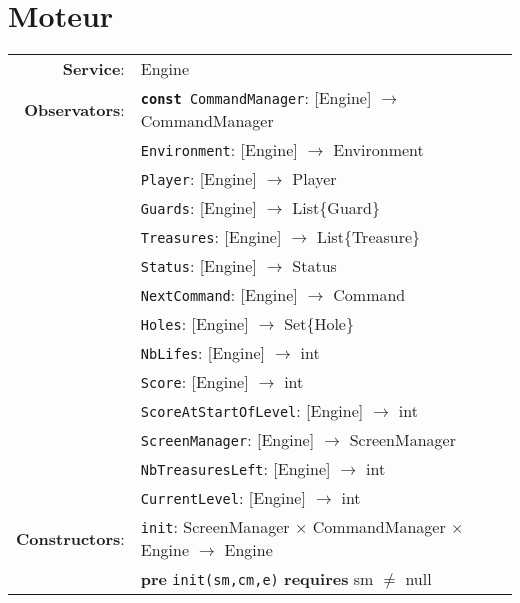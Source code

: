 \documentclass[7pt]{article}
\begin{document}
\newpage

\section*{Moteur}

\begin{tabular}{rl}
\textbf{Service}: & \textrm{Engine} \\
{\textbf{Observators}}: &\texttt{\textbf{const} CommandManager}: \textrm{[Engine]}  $\rightarrow$ \textrm{CommandManager}  \\
&\texttt{Environment}: \textrm{[Engine]}  $\rightarrow$ \textrm{Environment}  \\
&\texttt{Player}: \textrm{[Engine]}  $\rightarrow$ \textrm{Player}  \\
&\texttt{Guards}: \textrm{[Engine]}  $\rightarrow$ \textrm{List\{Guard\}}  \\
&\texttt{Treasures}: \textrm{[Engine]}  $\rightarrow$ \textrm{List\{Treasure\}}  \\
&\texttt{Status}: \textrm{[Engine]}  $\rightarrow$ \textrm{Status}  \\
&\texttt{NextCommand}: \textrm{[Engine]}  $\rightarrow$ \textrm{Command}  \\
&\texttt{Holes}: \textrm{[Engine]}  $\rightarrow$ \textrm{Set\{Hole\}}  \\
&\texttt{NbLifes}: \textrm{[Engine]}  $\rightarrow$ \textrm{int}  \\
&\texttt{Score}: \textrm{[Engine]}  $\rightarrow$ \textrm{int}  \\
&\texttt{ScoreAtStartOfLevel}: \textrm{[Engine]}  $\rightarrow$ \textrm{int}  \\
&\texttt{ScreenManager}: \textrm{[Engine]}  $\rightarrow$ \textrm{ScreenManager}  \\
&\texttt{NbTreasuresLeft}: \textrm{[Engine]}  $\rightarrow$ \textrm{int}  \\
&\texttt{CurrentLevel}: \textrm{[Engine]}  $\rightarrow$ \textrm{int}  \\

\textbf{Constructors}: & \texttt{init}: \textrm{ScreenManager} $\times$ \textrm{CommandManager} $\times$ \textrm{Engine}  $\rightarrow$ \textrm{Engine} \\
& \quad\quad \textbf{pre} \texttt{init(sm,cm,e)} \textbf{requires} sm $\neq$ null \\



\end{tabular}
\end{document}
